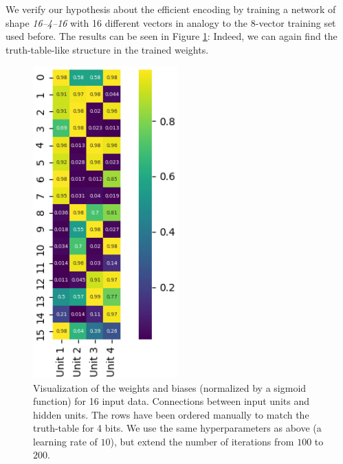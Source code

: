 \documentclass[conference]{IEEEtran}
\begin{document}
We verify our hypothesis about the efficient encoding by training a network of shape \textit{16--4--16} with 16 different vectors in analogy to the 8-vector training set used before. The results can be seen in Figure \ref{fig:hidden16}: Indeed, we can again find the truth-table-like structure in the trained weights.

\begin{figure}
    \centering
    \includegraphics[height=12cm]{hidden16.png}
    \caption{Visualization of the weights and biases (normalized by a sigmoid function) for 16 input data. Connections between input units and hidden units. The rows have been ordered manually to match the truth-table for 4 bits. We use the same hyperparameters as above (a learning rate of $10$), but extend the number of iterations from $100$ to $200$.}
    \label{fig:hidden16}
\end{figure}


\printbibliography

\newpage
\end{document}
